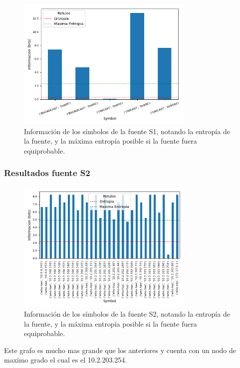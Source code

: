 \begin{figure}[H]
  \centering
  \includegraphics[width=8.5cm]{figs/information_labo6_2018_04_18_S1_output.png}
  \caption{\normalfont Información de los símbolos de la fuente S1, notando la entropía de la fuente, y la máxima entropía posible si la fuente fuera equiprobable.}
\end{figure}

\subsubsection*{Resultados fuente S2}

\begin{figure}[H]
  \centering
  \includegraphics[width=8.5cm]{figs/information_labo6_2018_04_18_S2_output.png}
  \caption{\normalfont Información de los símbolos de la fuente S2, notando la entropía de la fuente, y la máxima entropía posible si la fuente fuera equiprobable.}
\end{figure}

Este grafo es mucho mas grande que los anteriores y cuenta con un nodo de maximo grado el cual es el 10.2.203.254.

